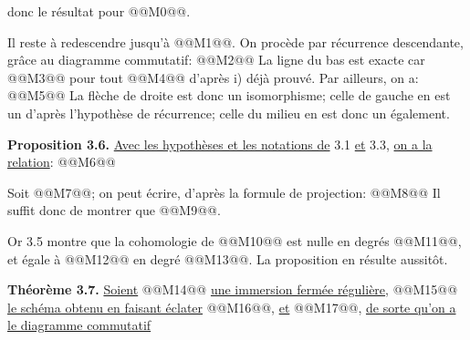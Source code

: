 
donc le résultat pour @@M0@@.

Il reste à redescendre jusqu'à @@M1@@. On procède par récurrence descendante, grâce au diagramme commutatif:
@@M2@@
La ligne du bas est exacte car @@M3@@ pour tout @@M4@@ d'après i) déjà prouvé. Par ailleurs, on a:
@@M5@@
La flèche de droite est donc un isomorphisme; celle de gauche en est un d'après l'hypothèse de récurrence; celle du milieu en est donc un également.

\textbf{Proposition 3.6.} \uline{Avec les hypothèses et les notations de} 3.1 \uline{et} 3.3, \uline{on a la relation}:
@@M6@@

Soit @@M7@@; on peut écrire, d'après la formule de projection:
@@M8@@
Il suffit donc de montrer que @@M9@@.

Or 3.5 montre que la cohomologie de @@M10@@ est nulle en degrés @@M11@@, et égale à @@M12@@ en degré @@M13@@. La proposition en résulte aussitôt.

\textbf{Théorème 3.7.} \uline{Soient} @@M14@@ \uline{une immersion fermée régulière}, @@M15@@ \uline{le schéma obtenu en faisant éclater} @@M16@@, \uline{et} @@M17@@, \uline{de sorte qu'on a le diagramme commutatif}

